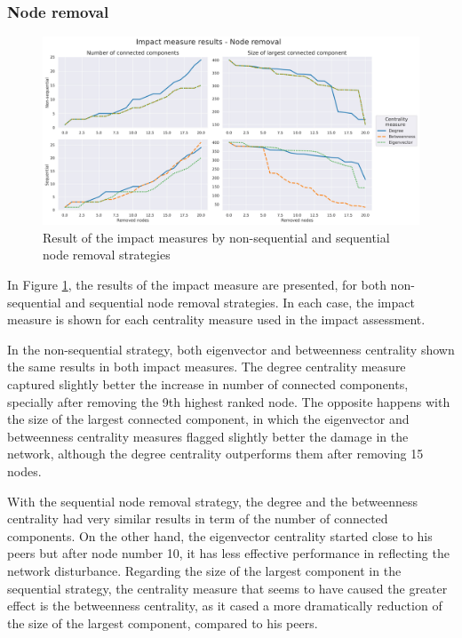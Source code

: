 \documentclass{article}
\begin{document}
\subsubsection{Node removal}


\begin{figure}[htp]
    \centering
    \includegraphics[width=15cm]{Results_Impact_Measures_Total.jpg}
    \caption{Result of the impact measures by non-sequential and sequential node removal strategies}
    \label{fig:impact_results}
\end{figure}

In Figure \ref{fig:impact_results}, the results of the impact measure are presented, for both non-sequential and sequential node removal strategies. In each case, the impact measure is shown for each centrality measure used in the impact assessment. 

In the non-sequential strategy, both eigenvector and betweenness centrality shown the same  results in both impact measures. The degree centrality measure captured slightly better the increase in number of connected components, specially after removing the 9th highest ranked node. The opposite happens with the size of the largest connected component, in which the eigenvector and betweenness centrality measures flagged slightly better the damage in the network, although the degree centrality outperforms them after removing 15 nodes.

With the sequential node removal strategy, the degree and the betweenness centrality had very similar results in term of the number of connected components. On the other hand, the eigenvector centrality started close to his peers but after node number 10, it has less effective performance in reflecting the network disturbance. Regarding the size of the largest component in the sequential strategy, the centrality measure that seems to have caused the greater effect is the betweenness centrality, as it cased a more dramatically reduction of the size of the largest component, compared to his peers.
\end{document}
